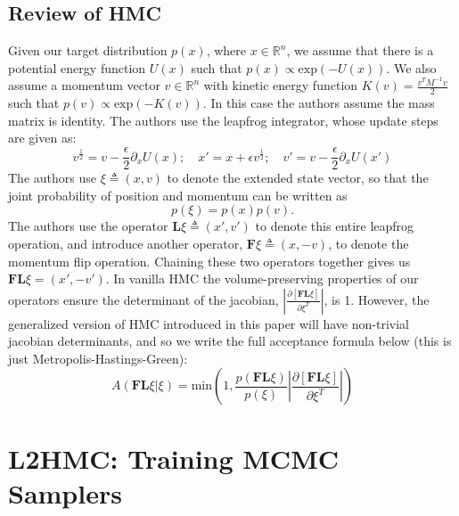 \documentclass[twoside]{article}
\begin{document}
\subsection{Review of HMC}
Given our target distribution $p(x)$, where $x \in \mathbb{R}^n$, we assume that there is a potential energy function $U(x)$ such that $p(x) \propto \text{exp}(-U(x))$. We also assume a momentum vector $v \in \mathbb{R}^n$ with kinetic energy function $K(v) = \frac{v^TM^{-1}v}{2}$ such that $p(v) \propto \text{exp}(-K(v))$. In this case the authors assume the mass matrix is identity. 
The authors use the leapfrog integrator, whose update steps are given as:
\begin{equation}
    v^{\frac{1}{2}} = v - \frac{\epsilon}{2} \partial_x U(x); \quad x' = x + \epsilon v^{\frac{1}{2}}; \quad v' = v- \frac{\epsilon}{2} \partial_x U(x')
\end{equation}
The authors use $\xi \triangleq (x,v)$ to denote the extended state vector, so that the joint probability of position and momentum can be written as
\begin{equation}
    p(\xi) = p(x)p(v).
\end{equation}
The authors use the operator $\textbf{L}\xi \triangleq (x',v')$ to denote this entire leapfrog operation, and introduce another operator, $\textbf{F}\xi \triangleq (x,-v)$, to denote the momentum flip operation. Chaining these two operators together gives us $\textbf{FL}\xi = (x',-v')$. In vanilla HMC the volume-preserving properties of our operators ensure the determinant of the jacobian, $\left| \frac{\partial[\textbf{FL}\xi]}{\partial \xi^T}\right|$, is 1. However, the generalized version of HMC introduced in this paper will have non-trivial jacobian determinants, and so we write the full acceptance formula below (this is just Metropolis-Hastings-Green):
\begin{equation}
    A(\textbf{FL}\xi | \xi) = \text{min} \left( 1, \frac{p(\textbf{FL}\xi)}{p(\xi)}\left| \frac{\partial[\textbf{FL}\xi]}{\partial \xi^T}\right|\right)
\end{equation}


\section{L2HMC: Training MCMC Samplers}
\end{document}
